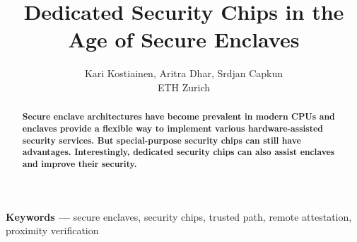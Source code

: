 

\graphicspath{{images/}}

\title{Dedicated Security Chips in the Age of Secure Enclaves} 

\author{Kari Kostiainen, Aritra Dhar, Srdjan Capkun \\ ETH Zurich}


\maketitle
\thispagestyle{empty}

\begin{abstract}
\textbf{Secure enclave architectures have become prevalent in modern CPUs and enclaves provide a flexible way to implement various hardware-assisted security services. But special-purpose security chips can still have advantages. Interestingly, dedicated security chips can also assist enclaves and improve their security.}
\end{abstract}

\vspace{10pt}
\noindent
\textbf{Keywords ---} secure enclaves, security chips, trusted path, remote attestation, proximity verification








{\small

}
 


 
 

